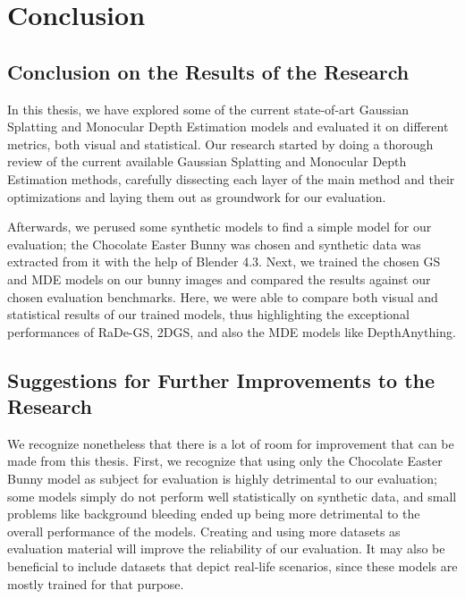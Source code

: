 
\chapter{Conclusion}\label{chapter:conclusion}

\section{Conclusion on the Results of the Research}

In this thesis, we have explored some of the current state-of-art Gaussian Splatting and Monocular Depth Estimation models and evaluated it on different metrics, both visual and statistical. Our research started by doing a thorough review of the current available Gaussian Splatting and Monocular Depth Estimation methods, carefully dissecting each layer of the main method and their optimizations and laying them out as groundwork for our evaluation.

Afterwards, we perused some synthetic models to find a simple model for our evaluation; the Chocolate Easter Bunny was chosen and synthetic data was extracted from it with the help of Blender 4.3. Next, we trained the chosen GS and MDE models on our bunny images and compared the results against our chosen evaluation benchmarks. Here, we were able to compare both visual and statistical results of our trained models, thus highlighting the exceptional performances of RaDe-GS, 2DGS, and also the MDE models like DepthAnything.

\section{Suggestions for Further Improvements to the Research}

We recognize nonetheless that there is a lot of room for improvement that can be made from this thesis. First, we recognize that using only the Chocolate Easter Bunny model as subject for evaluation is highly detrimental to our evaluation; some models simply do not perform well statistically on synthetic data, and small problems like background bleeding ended up being more detrimental to the overall performance of the models. Creating and using more datasets as evaluation material will improve the reliability of our evaluation. It may also be beneficial to include datasets that depict real-life scenarios, since these models are mostly trained for that purpose.

